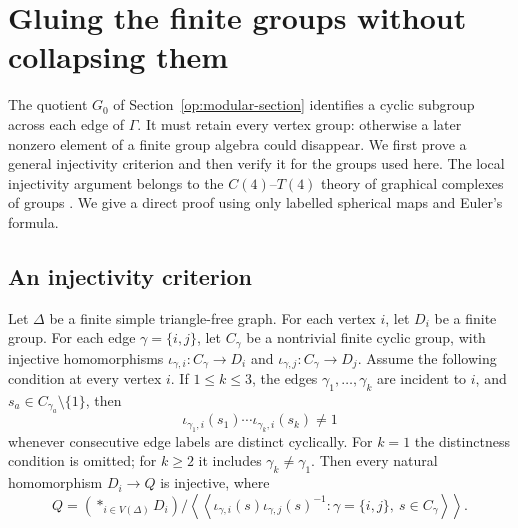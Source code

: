 \section{Gluing the finite groups without collapsing them}\label{sec:gluing}

The quotient $G_0$ of Section~\ref{op:modular-section} identifies a cyclic
subgroup across each edge of $\Gamma$. It must
retain every vertex group: otherwise a later nonzero element of a finite
group algebra could disappear.  We first prove a general injectivity
criterion and then verify it for the groups used here.  The local
injectivity argument belongs to the $C(4)$--$T(4)$ theory of graphical
complexes of groups \cite[Section~8]{Prytula2024}.  We give a direct
proof using only labelled spherical maps and Euler's formula.

\subsection{An injectivity criterion}

\begin{lemma}\label{lem:triangle-free-gluing}
Let $\Delta$ be a finite simple triangle-free graph.  For each vertex $i$,
let $D_i$ be a finite group.  For each edge $\gamma=\{i,j\}$, let
$C_\gamma$ be a nontrivial finite cyclic group, with injective homomorphisms
$\iota_{\gamma,i}:C_\gamma\to D_i$ and
$\iota_{\gamma,j}:C_\gamma\to D_j$.
Assume the following condition at every vertex $i$.  If $1\leq k\leq3$,
the edges $\gamma_1,\ldots,\gamma_k$ are incident to $i$, and
$s_a\in C_{\gamma_a}\setminus\{1\}$, then
\begin{equation}\label{eq:gluing-short-word}
 \iota_{\gamma_1,i}(s_1)\cdots
 \iota_{\gamma_k,i}(s_k)\neq1
\end{equation}
whenever consecutive edge labels are distinct cyclically.  For $k=1$
the distinctness condition is omitted; for $k\geq2$ it includes
$\gamma_k\neq\gamma_1$.
Then every natural homomorphism $D_i\to Q$ is injective, where
\[
 Q=\left(*_{i\in V(\Delta)}D_i\right)
 \big/\left\langle\!\left\langle
 \iota_{\gamma,i}(s)\iota_{\gamma,j}(s)^{-1}:
 \gamma=\{i,j\},\ s\in C_\gamma
 \right\rangle\!\right\rangle.
\]
\end{lemma}


